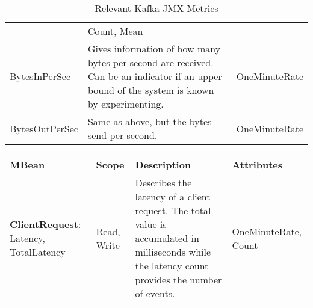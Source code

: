 \begin{table}[]
\begin{tabular}{@{}lp{7.5cm}l@{}}
                                 & Count, Mean \\
BytesInPerSec                 &  Gives information of how many bytes per second are received.
                                 Can be an indicator if an upper bound of the system is known by experimenting.
                                 & OneMinuteRate \\
BytesOutPerSec                &  Same as above, but the bytes send per second.  & OneMinuteRate \\
\bottomrule
\end{tabular}
\centering
\caption{Relevant Kafka JMX Metrics}
\label{tab:jmx_kafka}
\end{table}


\begin{table}[]
    \begin{tabular}{@{}p{3.2cm}p{2.7cm}p{6.7cm}p{2.2cm}@{}}
\toprule
MBean                                                & Scope             & Description & Attributes \\ \midrule
\textbf{ClientRequest}: Latency, TotalLatency                & Read, Write       &
                                                             Describes the latency of a client request.
                                                             The total value is accumulated in milliseconds while the latency count provides the number of events.
                                                             & OneMinuteRate, Count \\


\end{tabular}
\end{table}
